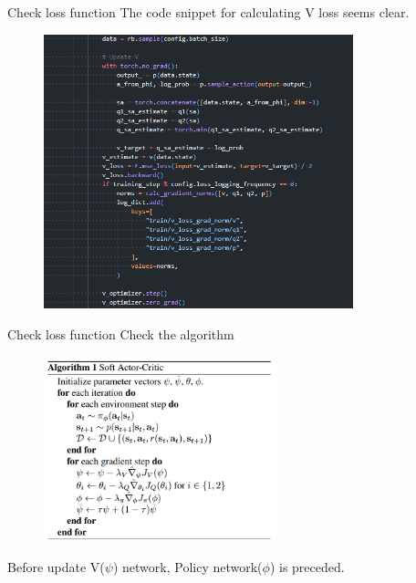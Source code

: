 \documentclass[8pt]{beamer}
\begin{document}
\begin{frame}{Check loss function}
    The code snippet for calculating V loss seems clear.

    \begin{figure}
        \centering
        \includegraphics[width=0.8\textwidth]{fig5.png}
    \end{figure}

\end{frame}

\begin{frame}{Check loss function}
    Check the algorithm
    \begin{figure}
        \centering
        \includegraphics[width=0.6\textwidth]{fig6.png}
    \end{figure}
    Before update V($\psi$) network, Policy network($\phi$) is preceded.
\end{frame}
\end{document}
